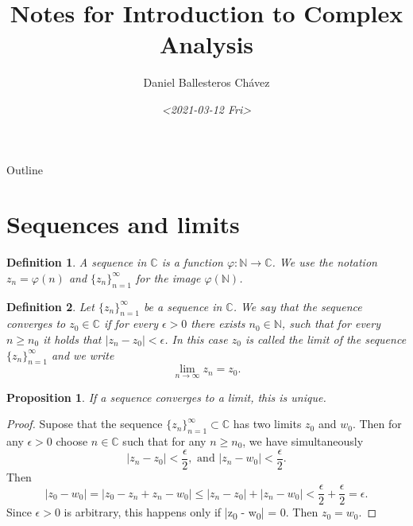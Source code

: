 \documentclass{amsart}
\author{Daniel Ballesteros Chávez}
\date{\textit{<2021-03-12 Fri>}}
\title{Notes for Introduction to Complex Analysis}
\newtheorem{prop}{Proposition}
\newtheorem{mydef}{Definition}
\begin{document}
\maketitle
\begin{frame}{Outline}
\tableofcontents
\end{frame}





\section{Sequences and limits}
\label{sec:org1d66734}

\begin{mydef}
A sequence in \(\mathbb{C}\) is a function \(\varphi: \mathbb{N}\to \mathbb{C}\). We use the notation
\(z_n = \varphi(n)\) and \(\{z_n\}_{n=1}^{\infty}\) for the image \(\varphi(\mathbb{N})\).
\end{mydef}


\begin{mydef}
Let \(\{z_n\}_{n=1}^{\infty}\) be a sequence in \(\mathbb{C}\). We say that the sequence converges to \(z_0\in \mathbb{C}\)
if for every \(\epsilon >0\) there exists \(n_0\in \mathbb{N}\), such that for every \(n\geq n_0\) it holds that \(|z_n - z_0| < \epsilon\). In this case
\(z_0\) is called the limit of the sequence \(\{z_n\}_{n=1}^{\infty}\) and we write
\[ \lim_{n\to\infty} z_n = z_0. \]
\end{mydef}

\begin{prop}
If a sequence converges to a limit, this is unique.
\end{prop}
\begin{proof}
Supose that the sequence \(\{z_n\}_{n=1}^{\infty}\subset \mathbb{C}\) has two limits \(z_0\) and \(w_0\). Then for any \(\epsilon >0\) choose \(n\in \mathbb{C}\) such that for any \(n\geq n_0\), 
we have simultaneously \[ |z_n  - z_0| < \frac{\epsilon}{2}, \mbox{ and } |z_n - w_0 | < \frac{\epsilon}{2}. \] 
Then
\[ | z_0 - w_0 | = |z_0 - z_n + z_n - w_0 | \leq | z_n - z_0 | + | z_n - w_0| < \frac{\epsilon}{2} + \frac{\epsilon}{2} = \epsilon. \]
Since \(\epsilon >0\) is arbitrary, this happens only if |z\textsubscript{0} - w\textsubscript{0}|  = 0. Then \(z_0 = w_0\).
\end{proof}
\end{document}
